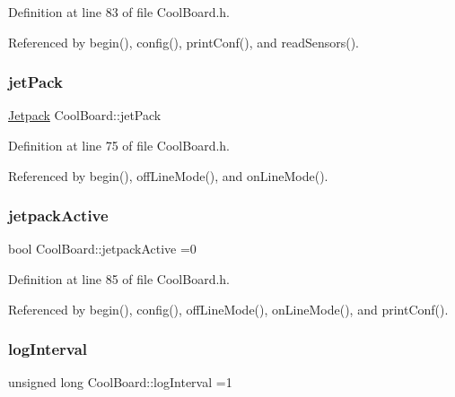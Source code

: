 Definition at line 83 of file Cool\+Board.\+h.



Referenced by begin(), config(), print\+Conf(), and read\+Sensors().

\mbox{\label{classCoolBoard_a30b1357881b01ccbec676856a91e48e9}} 
\subsubsection{\texorpdfstring{jet\+Pack}{jetPack}}
{\footnotesize\ttfamily \hyperlink{classJetpack}{Jetpack} Cool\+Board\+::jet\+Pack\hspace{0.3cm}{\ttfamily [private]}}



Definition at line 75 of file Cool\+Board.\+h.



Referenced by begin(), off\+Line\+Mode(), and on\+Line\+Mode().

\mbox{\label{classCoolBoard_a9be03a913d26e558328935ca3b59a75e}} 
\subsubsection{\texorpdfstring{jetpack\+Active}{jetpackActive}}
{\footnotesize\ttfamily bool Cool\+Board\+::jetpack\+Active =0\hspace{0.3cm}{\ttfamily [private]}}



Definition at line 85 of file Cool\+Board.\+h.



Referenced by begin(), config(), off\+Line\+Mode(), on\+Line\+Mode(), and print\+Conf().

\mbox{\label{classCoolBoard_a84bc94413b64973e4aba8c467c97006c}} 
\subsubsection{\texorpdfstring{log\+Interval}{logInterval}}
{\footnotesize\ttfamily unsigned long Cool\+Board\+::log\+Interval =1\hspace{0.3cm}{\ttfamily [private]}}



